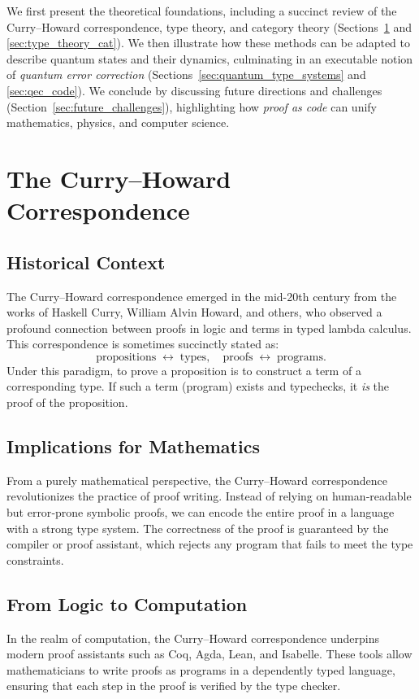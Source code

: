 \documentclass[12pt]{article}
\begin{document}
We first present the theoretical foundations, including a succinct review of the Curry--Howard correspondence, type theory, and category theory (Sections~\ref{sec:curry_howard} and \ref{sec:type_theory_cat}). We then illustrate how these methods can be adapted to describe quantum states and their dynamics, culminating in an executable notion of \emph{quantum error correction} (Sections~\ref{sec:quantum_type_systems} and \ref{sec:qec_code}). We conclude by discussing future directions and challenges (Section~\ref{sec:future_challenges}), highlighting how \emph{proof as code} can unify mathematics, physics, and computer science.

\section{The Curry--Howard Correspondence}
\label{sec:curry_howard}

\subsection{Historical Context}
The Curry--Howard correspondence emerged in the mid-20th century from the works of Haskell Curry, William Alvin Howard, and others, who observed a profound connection between proofs in logic and terms in typed lambda calculus. This correspondence is sometimes succinctly stated as:
\[
\text{propositions} \;\leftrightarrow\; \text{types}, \quad
\text{proofs} \;\leftrightarrow\; \text{programs}.
\]
Under this paradigm, to prove a proposition is to construct a term of a corresponding type. If such a term (program) exists and typechecks, it \emph{is} the proof of the proposition.

\subsection{Implications for Mathematics}
From a purely mathematical perspective, the Curry--Howard correspondence revolutionizes the practice of proof writing. Instead of relying on human‐readable but error‐prone symbolic proofs, we can encode the entire proof in a language with a strong type system. The correctness of the proof is guaranteed by the compiler or proof assistant, which rejects any program that fails to meet the type constraints.

\subsection{From Logic to Computation}
In the realm of computation, the Curry--Howard correspondence underpins modern proof assistants such as Coq, Agda, Lean, and Isabelle. These tools allow mathematicians to write proofs as programs in a dependently typed language, ensuring that each step in the proof is verified by the type checker.
\end{document}
